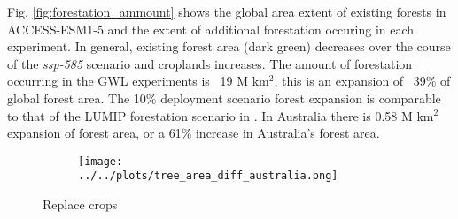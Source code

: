 \documentclass[]{article}
\begin{document}
Fig. \ref{fig:forestation_ammount} shows the global area extent of existing forests in ACCESS-ESM1-5 and the extent of additional forestation occuring in each experiment.
In general, existing forest area (dark green) decreases over the course of the \textit{ssp-585} scenario and croplands increases.
The amount of forestation occurring in the GWL experiments is ~19 M km$^2$, this is an expansion of ~39\% of global forest area.
The 10\% deployment scenario forest expansion is comparable to that of the LUMIP forestation scenario in \cite{loughran_limited_2023}.
In Australia there is 0.58 M km$^2$ expansion of forest area, or a 61\% increase in Australia's forest area.

\begin{figure}[H]
    \begin{subfigure}[b]{\linewidth}
        \centering
        \texttt{[image: ../../plots/tree\_area\_diff\_australia.png]}
    \end{subfigure}
    \caption{Replace crops}
    \label{fig:to_forest}
\end{figure}
\end{document}
